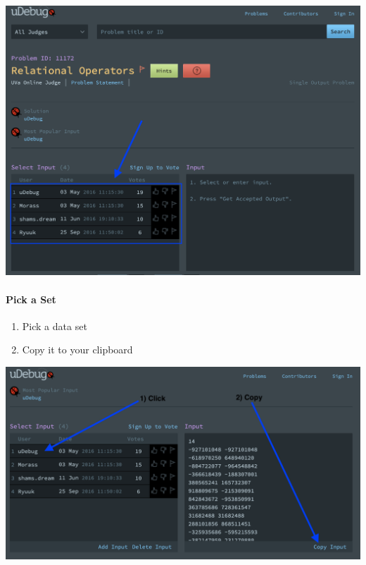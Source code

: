 \begin{center}
\includegraphics[scale=.4]{images/uhunt_debug_get_data.png}
\end{center}

\hypertarget{pick-a-set}{%
\paragraph{Pick a Set}\label{pick-a-set}}

\begin{enumerate}
\def\labelenumi{\arabic{enumi}.}
\tightlist
\item
  Pick a data set
\item
  Copy it to your clipboard
\end{enumerate}


\begin{center}
\includegraphics[scale=.4]{images/uhunt_debug_copy_data.png}
\end{center}

